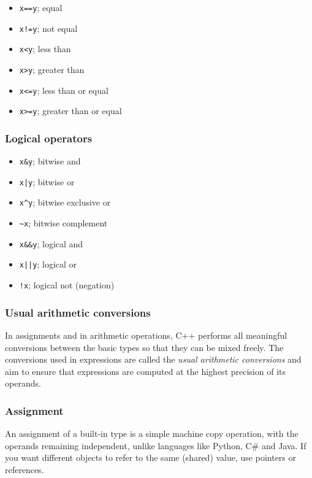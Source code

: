 \documentclass[8pt, table, xcdraw]{article}%
\begin{document}
\begin{itemize}[leftmargin=15pt,noitemsep,nolistsep]
\item \lstinline{x==y}; equal
\item \lstinline{x!=y}; not equal
\item \lstinline{x<y}; less than
\item \lstinline{x>y}; greater than
\item \lstinline{x<=y}; less than or equal
\item \lstinline{x>=y}; greater than or equal
\end{itemize}

\subsubsection{Logical operators}

\begin{itemize}[leftmargin=15pt,noitemsep,nolistsep]
\item \lstinline{x&y}; bitwise and
\item \lstinline{x|y}; bitwise or
\item \lstinline{x^y}; bitwise exclusive or
\item \lstinline{~x}; bitwise complement
\item \lstinline{x&&y}; logical and
\item \lstinline{x||y}; logical or
\item \lstinline{!x}; logical not (negation)
\end{itemize}

\subsubsection{Usual arithmetic conversions}
In assignments and in arithmetic operations, C++ performs all meaningful conversions between the basic types so that they can be mixed freely. The conversions used in expressions are called the \textit{usual arithmetic conversions} and aim to ensure that expressions are computed at the highest precision of its operands.

\subsubsection{Assignment}
An assignment of a built-in type is a simple machine copy operation, with the operands remaining independent, unlike languages like Python, C\# and Java. If you want different objects to refer to the same (shared) value, use pointers or references.
\end{document}
